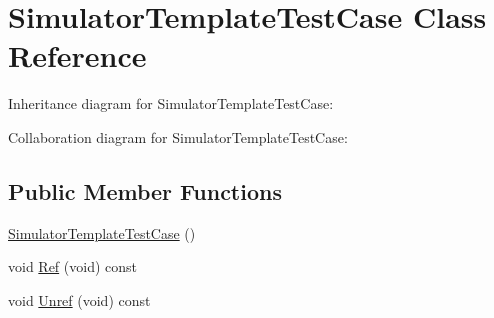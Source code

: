 \hypertarget{classSimulatorTemplateTestCase}{}\section{Simulator\+Template\+Test\+Case Class Reference}
\label{classSimulatorTemplateTestCase}


Inheritance diagram for Simulator\+Template\+Test\+Case\+:


Collaboration diagram for Simulator\+Template\+Test\+Case\+:
\subsection*{Public Member Functions}
\begin{DoxyCompactItemize}
\item 
\hyperlink{classSimulatorTemplateTestCase_a64b887a0aa04d83f2a6d3f517a864a95}{Simulator\+Template\+Test\+Case} ()
\item 
void \hyperlink{classSimulatorTemplateTestCase_a9580cf032a5dd98801aacdc9ad06f46f}{Ref} (void) const 
\item 
void \hyperlink{classSimulatorTemplateTestCase_ac9ee0f8189102dde1f46d60e8da87486}{Unref} (void) const 
\end{DoxyCompactItemize}
